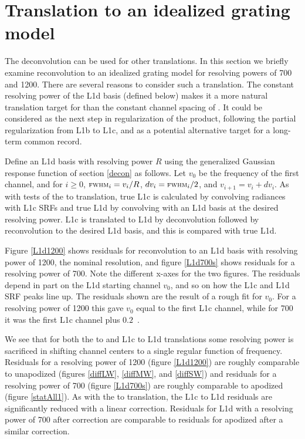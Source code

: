 \documentclass[journal]{IEEEtran}
\begin{document}
\section{Translation to an idealized grating model}
\label{airsL1d}


The {\airs} deconvolution can be used for other translations.  
In this section we briefly examine reconvolution to an idealized
grating model for resolving powers of 700 and 1200.  There are
several reasons to consider such a translation.  The constant
resolving power of the L1d basis (defined below) makes it a more
natural translation target for {\airs} than the constant channel
spacing of {\cris}.  It could be considered as the next step in
regularization of the {\airs} product, following the partial
regularization from L1b to L1c, and as a potential alternative
target for a long-term common record.

Define an {\airs} L1d basis with resolving power $R$ using the
generalized Gaussian response function of section \ref{decon} as
follows.  Let $v_0$ be the frequency of the first channel, and for
$i\ge0$, $\mbox{\small\textsc{fwhm}}_i = v_i / R$, $dv_i = \mbox{\small\textsc{fwhm}}_i / 2$, and $v_{i+1} =
v_i + dv_i$.  As with tests of the {\airs} to {\cris} translation,
true L1c is calculated by convolving {\kcarta} radiances with
{\airs} L1c SRFs and true L1d by convolving with an L1d basis at the
desired resolving power.  L1c is translated to L1d by deconvolution
followed by reconvolution to the desired L1d basis, and this is
compared with true L1d.

Figure \ref{L1d1200} shows residuals for reconvolution to an L1d
basis with resolving power of 1200, the nominal {\airs} resolution,
and figure \ref{L1d700s} shows residuals for a resolving power of
700.  Note the different x-axes for the two figures.  The residuals
depend in part on the L1d starting channel $v_0$, and so on how the
L1c and L1d SRF peaks line up.  The residuals shown are the result
of a rough fit for $v_0$.  For a resolving power of 1200 this gave
$v_0$ equal to the first L1c channel, while for 700 it was the first
L1c channel plus $0.2$~\wn.

We see that for both the {\airs} to {\cris} and L1c to L1d
translations some resolving power is sacrificed in shifting channel
centers to a single regular function of frequency.  Residuals for a
resolving power of 1200 (figure \ref{L1d1200}) are roughly
comparable to unapodized {\cris} (figures \ref{diffLW},
\ref{diffMW}, and \ref{diffSW}) and residuals for a resolving power
of 700 (figure \ref{L1d700s}) are roughly comparable to apodized
{\cris} (figure \ref{statAll1}).  As with the {\airs} to {\cris}
translation, the L1c to L1d residuals are significantly reduced with
a linear correction.  Residuals for L1d with a resolving power of
700 after correction are comparable to residuals for apodized
{\cris} after a similar correction.
\end{document}

